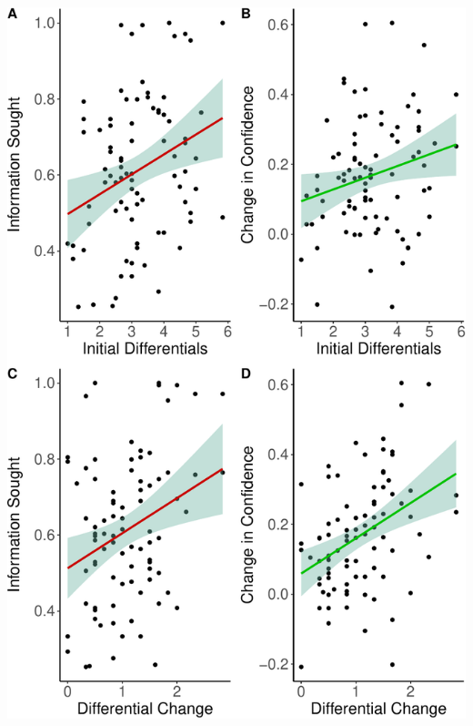 \documentclass[a4paper, nobind]{templates/ociamthesis}
\begin{document}
\newpage

\begin{center}\includegraphics[width=1\linewidth]{_main_files/figure-latex/diffsPlot-1} \end{center}
\end{document}

